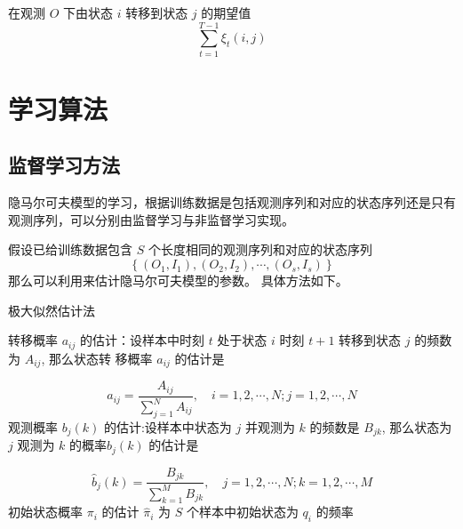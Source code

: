 \begin{theorem}
    在观测 $ O $ 下由状态 $ i $ 转移到状态 $ j $ 的期望值
\begin{equation} \sum_{t=1}^{T-1} \xi_{t}(i, j) \end{equation}
\end{theorem}

\section{学习算法}

\subsection{监督学习方法}

隐马尔可夫模型的学习，根据训练数据是包括观测序列和对应的状态序列还是只有观测序列，可以分别由监督学习与非监督学习实现。 

假设已给训练数据包含 $ S $ 个长度相同的观测序列和对应的状态序列 \begin{equation} \left\{\left(O_{1}, I_{1}\right),\left(O_{2}, I_{2}\right), \cdots,\left(O_{s}, I_{s}\right)\right\} \end{equation}
那么可以利用来估计隐马尔可夫模型的参数。 具体方法如下。

\begin{algorithm}[htbp]
    \caption{极大似然估计法}
    

    转移概率 $ a_{i j} $ 的估计：设样本中时刻 $ t $ 处于状态 $ i $ 时刻 $ t+1 $ 转移到状态 $ j $ 的频数为 $ A_{i j} $, 那么状态转 移概率 $ a_{i j} $ 的估计是
    
    \begin{equation} \hat{a}_{i j}=\frac{A_{i j}}{\sum_{j=1}^{N} A_{i j}}, \quad i=1,2, \cdots, N ; j=1,2, \cdots, N \end{equation}
    \;
    观测概率 $ b_{j}(k) $ 的估计:设样本中状态为 $ j $ 并观测为 $ k $ 的频数是 $ B_{j k} $, 那么状态为 $ j $ 观测为 $ k $ 的概率$ b_{j}(k) $ 的估计是

    \begin{equation}
    \hat{b}_{j}(k)=\frac{B_{j k}}{\sum_{k=1}^{M} B_{j k}}, \quad j=1,2, \cdots, N ; k=1,2, \cdots, M
    \end{equation}\;
    初始状态概率 $ \pi_{i} $ 的估计 $ \hat{\pi}_{i} $ 为 $ S $ 个样本中初始状态为 $ q_{i} $ 的频率\;

\end{algorithm}

